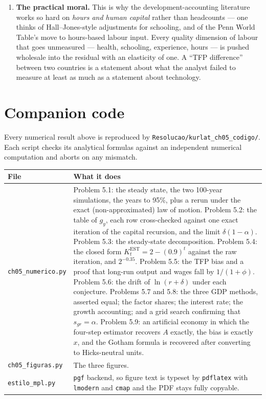 \documentclass[12pt, letterpaper]{article}
\newcommand{\EST}{^{\mathrm{EST}}}
\begin{document}
\begin{tcolorbox}[oddbox,title={Problem 5.9 \quad Disease and TFP}]
\begin{enumerate}[label=\textbf{\arabic*.},leftmargin=1.6em,itemsep=4pt,topsep=3pt]
\item \textbf{The practical moral.} This is why the development-accounting literature works
so hard on \emph{hours and human capital} rather than headcounts --- one thinks of
Hall--Jones-style adjustments for schooling, and of the Penn World Table's move to
hours-based labour input. Every quality dimension of labour that goes unmeasured --- health,
schooling, experience, hours --- is pushed wholesale into the residual with an elasticity of
one. A ``TFP difference'' between two countries is a statement about what the analyst failed
to measure at least as much as a statement about technology.
\end{enumerate}
\end{tcolorbox}

\section*{Companion code}

Every numerical result above is reproduced by \texttt{Resolucao/kurlat\_ch05\_codigo/}. Each
script checks its analytical formulas against an independent numerical computation and aborts
on any mismatch.

\begin{center}
\begin{tabular}{@{}lp{10.2cm}@{}}
\toprule
\textbf{File} & \textbf{What it does} \\
\midrule
\texttt{ch05\_numerico.py} & Problem 5.1: the steady state, the two 100-year simulations, the
years to 95\%, plus a rerun under the exact (non-approximated) law of motion. Problem 5.2:
the table of $g_y$, each row cross-checked against one exact iteration of the capital
recursion, and the limit $\delta(1-\alpha)$. Problem 5.3: the steady-state decomposition.
Problem 5.4: the closed form $K\EST_t=2-(0.9)^t$ against the raw iteration, and $2^{-0.35}$.
Problem 5.5: the TFP bias and a proof that long-run output and wages fall by $1/(1+\phi)$.
Problem 5.6: the drift of $\ln(r+\delta)$ under each conjecture. Problems 5.7 and 5.8: the
three GDP methods, asserted equal; the factor shares; the interest rate; the growth
accounting; and a grid search confirming that $s_{gr}=\alpha$. Problem 5.9: an artificial
economy in which the four-step estimator recovers $A$ exactly, the bias is exactly $x$, and
the Gotham formula is recovered after converting to Hicks-neutral units. \\
\texttt{ch05\_figuras.py} & The three figures. \\
\texttt{estilo\_mpl.py} & \texttt{pgf} backend, so figure text is typeset by \texttt{pdflatex}
with \texttt{lmodern} and \texttt{cmap} and the PDF stays fully copyable. \\
\bottomrule
\end{tabular}
\end{center}
\end{document}
